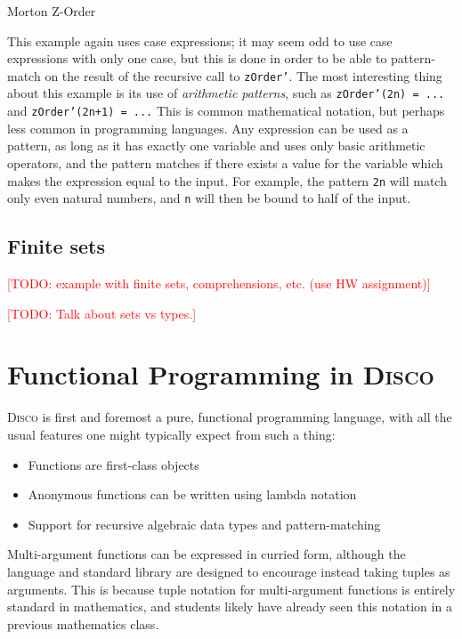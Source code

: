 \documentclass[submission,copyright,creativecommons]{eptcs}
\newcommand{\disco}{\textsc{Disco}\xspace}
\newcommand{\todo}[1]{\textcolor{red}{[TODO: #1]}}
\newcommand{\todo}[1]{}
\begin{document}
\begin{listing}[!htp]
\inputminted{text}{examples/zorder.disco}
\caption{Morton Z-Order}
\label{lst:zorder}
\end{listing}

This example again uses case expressions; it may seem odd to use case
expressions with only one case, but this is done in order to be able
to pattern-match on the result of the recursive call to
\texttt{zOrder'}.  The most interesting thing about this example is
its use of \emph{arithmetic patterns}, such as \texttt{zOrder'(2n) =
  ...}  and \texttt{zOrder'(2n+1) = ...}  This is common mathematical
notation, but perhaps less common in programming languages.  Any
expression can be used as a pattern, as long as it has exactly one
variable and uses only basic arithmetic operators, and the pattern
matches if there exists a value for the variable which makes the
expression equal to the input.  For example, the pattern \texttt{2n}
will match only even natural numbers, and \texttt{n} will then be
bound to half of the input.

\subsection{Finite sets}

\todo{example with finite sets, comprehensions, etc. (use HW assignment)}

\todo{Talk about sets vs types.}

\section{Functional Programming in \disco}
\label{sec:FP}

\disco is first and foremost a pure, functional programming language,
with all the usual features one might typically expect from such a thing:
\begin{itemize}
\item Functions are first-class objects
\item Anonymous functions can be written using lambda notation
\item Support for recursive algebraic data types and pattern-matching
\end{itemize}

Multi-argument functions can be expressed in curried form, although
the language and standard library are designed to encourage instead
taking tuples as arguments.  This is because tuple notation for
multi-argument functions is entirely standard in mathematics, and
students likely have already seen this notation in a previous
mathematics class.
\end{document}
